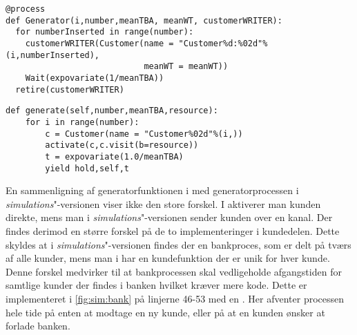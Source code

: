 \begin{lstlisting}[firstnumber=20, label=fig:sim:generator, caption=Generatorprocessen for Simulationsversionen]
@process
def Generator(i,number,meanTBA, meanWT, customerWRITER):
  for numberInserted in range(number):
    customerWRITER(Customer(name = "Customer%d:%02d"%(i,numberInserted),
                            meanWT = meanWT))
    Wait(expovariate(1/meanTBA))
  retire(customerWRITER)
\end{lstlisting}

\begin{lstlisting}[firstnumber=11, label=fig:simpy:generator, caption=Generator funktion for simpy]
def generate(self,number,meanTBA,resource):         
    for i in range(number):
        c = Customer(name = "Customer%02d"%(i,))
        activate(c,c.visit(b=resource))              
        t = expovariate(1.0/meanTBA)               
        yield hold,self,t
\end{lstlisting}

En sammenligning af generatorfunktionen i \simpy med generatorprocessen i \emph{simulations}"-versionen viser ikke den store forskel. I \simpy aktiverer man kunden direkte, mens man i \emph{simulations}"-versionen sender kunden over en kanal. Der findes derimod en større forskel på de to implementeringer i kundedelen. Dette skyldes at i \emph{simulations}"-versionen findes der en bankproces, som er delt på tværs af alle kunder, mens man i \simpy har en kundefunktion der er unik for hver kunde. Denne forskel medvirker til at bankprocessen skal vedligeholde afgangstiden for samtlige kunder der findes i banken  hvilket kræver mere kode. Dette er implementeret i  \cref{fig:sim:bank} på linjerne 46-53 med en . Her afventer processen hele tide på enten at modtage en ny kunde, eller på at en kunden ønsker at forlade banken.

